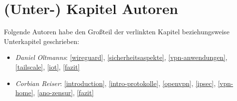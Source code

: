 \documentclass[assignment]{naklatex}
\begin{document}
    \hypersetup{pageanchor=false}
    
    

    \maketitle
    
    \hypersetup{pageanchor=true}
    \pagestyle{scrheadings}
    \frontmatter
    
    

    \clearpage
    \tableofcontents
    
    \printglossaries
    \clearpage
    \conditionalLoF
    \conditionalLoT
    \conditionalLoL

    \setcounter{figure}{0}
    
    \mainmatter

    
    
    
    
    
    
    \backmatter
    \printbibliography[title=Literaturverzeichnis]

     \chapter*{(Unter-) Kapitel Autoren}

    Folgende Autoren habe den Großteil der verlinkten Kapitel beziehungsweise Unterkapitel geschrieben:
    
    \begin{itemize}
        \item \textit{Daniel Oltmanns}: \ref{wireguard}, \ref{sicherheitsaspekte}, \ref{vpn-anwendungen}, \ref{tailscale}, \ref{iot}, \ref{fazit}
        \item \textit{Corbian Reiser}: \ref{introduction}, \ref{intro-protokolle}, \ref{openvpn}, \ref{ipsec}, \ref{vpn-home}, \ref{ano-zensur}, \ref{fazit} 
    \end{itemize}

    \finishWork
    
\end{document}
